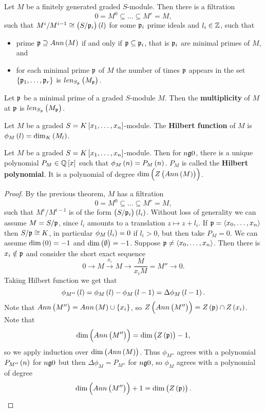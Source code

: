 \begin{theorem}
Let $ M $ be a finitely generated graded $ S $-module. Then there is a filtration
$$ 0 = M^0 \subseteq \dots \subseteq M^r = M, $$
such that $ M^i / M^{i - 1} \cong \br{S / \pp_i}\br{l} $ for some $ \mathfrak{p}_i $ prime ideals and $ l_i \in \mathbb{Z} $, such that
\begin{itemize}
\item prime $ \pp \supseteq Ann\br{M} $ if and only if $ \mathfrak{p} \subseteq \mathfrak{p}_i $, that is $ \mathfrak{p}_i $ are minimal primes of $ M $, and
\item for each minimal prime $ \mathfrak{p} $ of $ M $ the number of times $ \mathfrak{p} $ appears in the set $ \cbr{\pp_1, \dots, \pp_r} $ is $ len_{S_\pp}\br{M_\pp} $.
\end{itemize}
\end{theorem}


\begin{definition}
Let $ \mathfrak{p} $ be a minimal prime of a graded $ S $-module $ M $. Then the \textbf{multiplicity} of $ M $ at $ \mathfrak{p} $ is $ len_{S_\pp}\br{M_\pp} $.
\end{definition}

\begin{definition}
Let $ M $ be a graded $ S = K\sbr{x_1, \dots, x_n} $-module. The \textbf{Hilbert function} of $ M $ is $ \phi_M\br{l} = \dim_K\br{M_l} $.
\end{definition}

\begin{theorem}
Let $ M $ be a graded $ S = K\sbr{x_1, \dots, x_n} $-module. Then for $ n \g 0 $, there is a unique polynomial $ P_M \in \Q\sbr{x} $ such that $ \phi_M\br{n} = P_M\br{n} $. $ P_M $ is called the \textbf{Hilbert polynomial}. It is a polynomial of degree $ \dim\br{Z\br{Ann\br{M}}} $.
\end{theorem}

\begin{proof}
By the previous theorem, $ M $ has a filtration
$$ 0 = M^0 \subseteq \dots \subseteq M^r = M, $$
such that $ M^i / M^{i - 1} $ is of the form $ \br{S / \pp_i}\br{l_i} $. Without loss of generality we can assume $ M = S / \mathfrak{p} $, since $ l_i $ amounts to a translation $ z \mapsto z + l_i $. If $ \mathfrak{p} = \left\langle x_0, \dots, x_n \right\rangle $ then $ S / \mathfrak{p} \cong K $, in particular $ \phi_M\br{l_i} = 0 $ if $ l_i > 0 $, but then take $ P_M = 0 $. We can assume $ \dim\br{0} = -1 $ and $ \dim\br{\emptyset} = -1 $. Suppose $ \mathfrak{p} \ne \left\langle x_0, \dots, x_n \right\rangle $. Then there is $ x_i \notin \mathfrak{p} $ and consider the short exact sequence
$$ 0 \to M \xrightarrow{x_i} M \to \dfrac{M}{x_iM} = M'' \to 0. $$
Taking Hilbert function we get that
$$ \phi_{M''}\br{l} = \phi_M\br{l} - \phi_M\br{l - 1} = \Delta\phi_M\br{l - 1}. $$
Note that $ Ann\br{M''} = Ann\br{M} \cup \cbr{x_i} $, so $ Z\br{Ann\br{M''}} = Z\br{\pp} \cap Z\br{x_i} $. Note that
$$ \dim\br{Ann\br{M''}} = \dim\br{Z\br{\pp}} - 1, $$
so we apply induction over $ \dim\br{Ann\br{M}} $. Thus $ \phi_{M''} $ agrees with a polynomial $ P_{M''}\br{n} $ for $ n \g 0 $ but then $ \Delta\phi_M = P_{M''} $ for $ n \g 0 $, so $ \phi_M $ agrees with a polynomial of degree
$$ \dim\br{Ann\br{M''}} + 1 = \dim\br{Z\br{\pp}}. $$
\end{proof}

